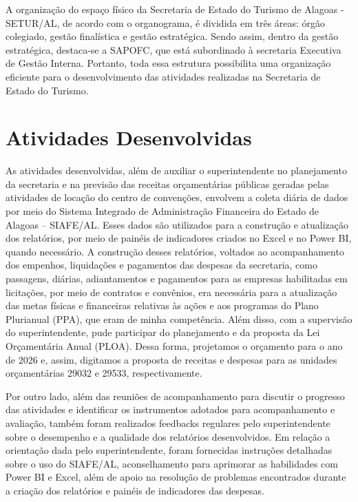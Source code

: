 \documentclass[12pt,a4paper]{article}
\begin{document}
	
	A organização do espaço físico da Secretaria de Estado do Turismo de Alagoas - SETUR/AL, de acordo com o organograma, é dividida em três áreas: órgão colegiado, gestão finalística e gestão estratégica. Sendo assim, dentro da gestão estratégica, destaca-se a SAPOFC, que está subordinado à secretaria Executiva de Gestão Interna. Portanto, toda essa estrutura possibilita uma organização eficiente para o desenvolvimento das atividades realizadas na Secretaria de Estado do Turismo.

	
	\section{Atividades Desenvolvidas}
	
	\hspace*{1,5cm} As atividades desenvolvidas, além de auxiliar o superintendente no planejamento da secretaria e na previsão das receitas orçamentárias públicas geradas pelas atividades de locação do centro de convenções, envolvem a coleta diária de dados por meio do Sistema Integrado de Administração Financeira do Estado de Alagoas – SIAFE/AL. Esses dados são utilizados para a construção e atualização dos relatórios, por meio de painéis de indicadores criados no Excel e no Power BI, quando necessário. A construção desses relatórios, voltados ao acompanhamento dos empenhos, liquidações e pagamentos das despesas da secretaria, como passagens, diárias, adiantamentos e pagamentos para as empresas habilitadas em licitações, por meio de contratos e convênios, era necessária para a atualização das metas físicas e financeiras relativas às ações e aos programas do Plano Plurianual (PPA), que eram de minha competência. Além disso, com a supervisão do superintendente, pude participar do planejamento e da proposta da Lei Orçamentária Anual (PLOA). Dessa forma, projetamos o orçamento para o ano de 2026 e, assim, digitamos a proposta de receitas e despesas para as unidades orçamentárias 29032 e 29533, respectivamente.
	
	Por outro lado, além das reuniões de acompanhamento para discutir o progresso das atividades e identificar os instrumentos adotados para acompanhamento e avaliação, também foram realizados feedbacks regulares pelo superintendente sobre o desempenho e a 
	qualidade dos relatórios desenvolvidos. Em relação a orientação dada pelo superintendente, foram fornecidas instruções detalhadas sobre o uso do SIAFE/AL, 
	aconselhamento para aprimorar as habilidades com Power BI e Excel, além de apoio na resolução de problemas encontrados durante a criação dos relatórios e painéis de indicadores das despesas.  
	
\end{document}
